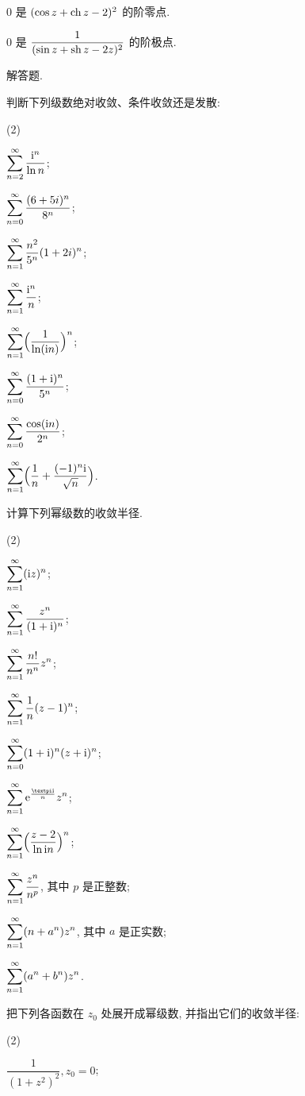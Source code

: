 \begin{homework}
\begin{homework}
    \item $0$ 是 $(\cos z+\operatorname{ch} z-2)^2$ 的\fillblank{}阶零点.
    \item $0$ 是 $\dfrac1{(\sin z+\operatorname{sh} z-2z)^2}$ 的\fillblank{}阶极点.
  \end{homework}
  \item 解答题.
  \begin{homework}
    \item 判断下列级数绝对收敛、条件收敛还是发散:
      \begin{subhomework}(2)
        \item $\displaystyle\sum_{n=2}^{\infty} \frac{\mathrm{i}^n}{\ln n}$;
        \item $\displaystyle\sum_{n=0}^{\infty} \frac{(6+5i)^n}{8^n}$;
        \item $\displaystyle\sum_{n=1}^{\infty} \frac{n^2}{5^n}(1+2i)^n$;
        \item $\displaystyle\sum_{n=1}^{\infty} \frac{\mathrm{i}^n}{n}$;
        \item $\displaystyle\sum_{n=1}^{\infty} \Bigl(\frac{1}{\ln (\mathrm{i} n)}\Bigr)^n$;
        \item $\displaystyle\sum_{n=0}^{\infty} \frac{(1+\mathrm{i})^n}{5^n}$;
        \item $\displaystyle\sum_{n=0}^{\infty} \frac{\cos(\mathrm{i} n)}{2^n}$;
        \item $\displaystyle\sum_{n=1}^{\infty} \Bigl(\frac1n+\frac{(-1)^n\mathrm{i}}{\sqrt n}\Bigr)$.
      \end{subhomework}
    \item 计算下列幂级数的收敛半径.
    \begin{subhomework}(2)
      \item $\displaystyle\sum_{n=1}^{\infty} (\mathrm{i} z)^n$;
      \item $\displaystyle\sum_{n=1}^{\infty} \frac{z^n}{(1+\mathrm{i})^n}$;
      \item $\displaystyle\sum_{n=1}^{\infty} \frac{n!}{n^n}z^n$;
      \item $\displaystyle\sum_{n=1}^{\infty} \frac1n(z-1)^n$;
      \item $\displaystyle\sum_{n=0}^{\infty} (1+\mathrm{i})^n(z+\mathrm{i})^n$;
      \item $\sumf1 \ee^{\frac{\cpi\ii}n}z^n$;
      \item $\displaystyle\sum_{n=1}^{\infty} \Bigl(\frac{z-2}{\ln{\mathrm{i}n}}\Bigr)^n$;
      \item $\displaystyle\sum_{n=1}^{\infty} \frac{z^n}{n^p}$, 其中 $p$ 是正整数;
      \item $\displaystyle\sum_{n=1}^{\infty} (n+a^n)z^n$, 其中 $a$ 是正实数;
      \item $\displaystyle\sum_{n=1}^{\infty} (a^n+b^n)z^n$.
    \end{subhomework}
    \item 把下列各函数在 $z_0$ 处展开成幂级数, 并指出它们的收敛半径:
    \begin{subhomework}(2)
      \item $\dfrac1{(1+z^2)^2}, z_0=0$;

\end{subhomework}
\end{homework}
\end{homework}
